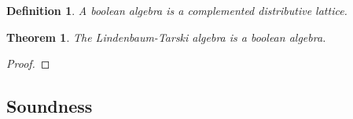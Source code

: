 \documentclass[titlepage]{article}
\newtheorem{theorem}{Theorem}[section]
\newtheorem{definition}{Definition}[section]
\begin{document}
\begin{definition}
    A boolean algebra is a complemented distributive lattice.
\end{definition}

\begin{theorem}
    The Lindenbaum-Tarski algebra is a boolean algebra.
\end{theorem}

\begin{proof}
    
\end{proof}

\subsection{Soundness}
















\newpage

\end{document}
